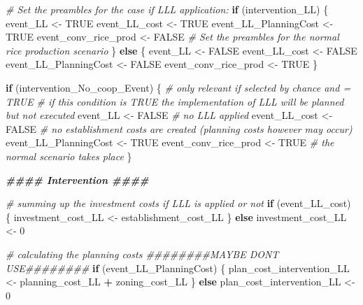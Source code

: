 \documentclass[
]{article}
\newenvironment{Shaded}{\begin{snugshade}}{\end{snugshade}}
\newcommand{\CommentTok}[1]{\textcolor[rgb]{0.56,0.35,0.01}{\textit{#1}}}
\newcommand{\ConstantTok}[1]{\textcolor[rgb]{0.56,0.35,0.01}{#1}}
\newcommand{\ControlFlowTok}[1]{\textcolor[rgb]{0.13,0.29,0.53}{\textbf{#1}}}
\newcommand{\DecValTok}[1]{\textcolor[rgb]{0.00,0.00,0.81}{#1}}
\newcommand{\DocumentationTok}[1]{\textcolor[rgb]{0.56,0.35,0.01}{\textbf{\textit{#1}}}}
\newcommand{\NormalTok}[1]{#1}
\newcommand{\OtherTok}[1]{\textcolor[rgb]{0.56,0.35,0.01}{#1}}
\newcommand{\SpecialCharTok}[1]{\textcolor[rgb]{0.81,0.36,0.00}{\textbf{#1}}}
\begin{document}
\begin{Shaded}
\begin{Highlighting}[]
  \CommentTok{\# Set the preambles for the case if LLL application:    }
  \ControlFlowTok{if}\NormalTok{ (intervention\_LL)}
\NormalTok{  \{}
\NormalTok{    event\_LL }\OtherTok{\textless{}{-}} \ConstantTok{TRUE}
\NormalTok{    event\_LL\_cost }\OtherTok{\textless{}{-}} \ConstantTok{TRUE}
\NormalTok{    event\_LL\_PlanningCost }\OtherTok{\textless{}{-}} \ConstantTok{TRUE}
\NormalTok{    event\_conv\_rice\_prod }\OtherTok{\textless{}{-}} \ConstantTok{FALSE}
  \CommentTok{\# Set the preambles for the normal rice production scenario}
\NormalTok{  \} }\ControlFlowTok{else}
\NormalTok{  \{}
\NormalTok{    event\_LL }\OtherTok{\textless{}{-}} \ConstantTok{FALSE}
\NormalTok{    event\_LL\_cost }\OtherTok{\textless{}{-}} \ConstantTok{FALSE}
\NormalTok{    event\_LL\_PlanningCost }\OtherTok{\textless{}{-}} \ConstantTok{FALSE}
\NormalTok{    event\_conv\_rice\_prod }\OtherTok{\textless{}{-}} \ConstantTok{TRUE}
\NormalTok{  \}}
  
  \ControlFlowTok{if}\NormalTok{ (intervention\_No\_coop\_Event) \{}
    \CommentTok{\# only relevant if selected by chance and = TRUE}
    \CommentTok{\# if this condition is TRUE the implementation of LLL will be planned but not executed}
\NormalTok{    event\_LL }\OtherTok{\textless{}{-}} \ConstantTok{FALSE} \CommentTok{\# no LLL applied}
\NormalTok{    event\_LL\_cost }\OtherTok{\textless{}{-}} \ConstantTok{FALSE} \CommentTok{\# no establishment costs are created (planning costs however may occur)}
\NormalTok{    event\_LL\_PlanningCost }\OtherTok{\textless{}{-}} \ConstantTok{TRUE}
\NormalTok{    event\_conv\_rice\_prod }\OtherTok{\textless{}{-}} \ConstantTok{TRUE} \CommentTok{\# the normal scenario takes place}
\NormalTok{\}}
    
  \DocumentationTok{\#\#\#\#  Intervention \#\#\#\#}
  
  \CommentTok{\# summing up the investment costs if LLL is applied or not}
  \ControlFlowTok{if}\NormalTok{ (event\_LL\_cost) \{}
\NormalTok{    investment\_cost\_LL }\OtherTok{\textless{}{-}}\NormalTok{ establishment\_cost\_LL}
\NormalTok{  \} }\ControlFlowTok{else}
\NormalTok{    investment\_cost\_LL }\OtherTok{\textless{}{-}} \DecValTok{0}
  
  \CommentTok{\# calculating the planning costs \#\#\#\#\#\#\#\#MAYBE DONT USE\#\#\#\#\#\#\#\#}
  \ControlFlowTok{if}\NormalTok{ (event\_LL\_PlanningCost) \{}
\NormalTok{    plan\_cost\_intervention\_LL }\OtherTok{\textless{}{-}}\NormalTok{ planning\_cost\_LL }\SpecialCharTok{+} 
\NormalTok{                                  zoning\_cost\_LL}
\NormalTok{  \} }\ControlFlowTok{else}
\NormalTok{    plan\_cost\_intervention\_LL }\OtherTok{\textless{}{-}} \DecValTok{0}
  

\end{Highlighting}
\end{Shaded}
\end{document}
